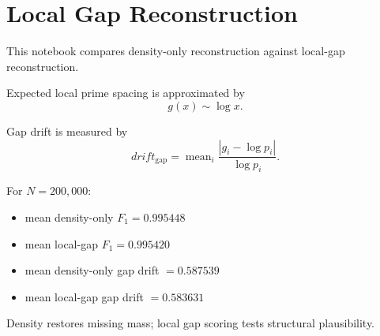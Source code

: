 \section*{Local Gap Reconstruction}

This notebook compares density-only reconstruction against local-gap reconstruction.

Expected local prime spacing is approximated by
\[
g(x)\sim \log x.
\]

Gap drift is measured by
\[
drift_{\mathrm{gap}} =
\operatorname{mean}_i \frac{|g_i-\log p_i|}{\log p_i}.
\]

For $N=200,000$:
\begin{itemize}
  \item mean density-only $F_1 = 0.995448$
  \item mean local-gap $F_1 = 0.995420$
  \item mean density-only gap drift $= 0.587539$
  \item mean local-gap gap drift $= 0.583631$
\end{itemize}

Density restores missing mass; local gap scoring tests structural plausibility.
